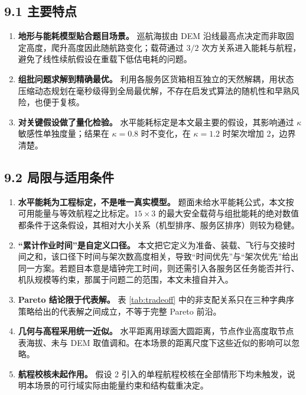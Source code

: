 \documentclass[withoutpreface,bwprint]{format}
\begin{document}
\subsection{9.1 主要特点}
\begin{enumerate}[leftmargin=*]
    \item \textbf{地形与能耗模型贴合题目场景。} 巡航海拔由 DEM 沿线最高点决定而非取固定高度，爬升高度因此随航路变化；载荷通过 $3/2$ 次方关系进入能耗与航程，避免了线性续航假设在重载下低估电耗的问题。
    \item \textbf{组批问题求解到精确最优。} 利用各服务区货箱相互独立的天然解耦，用状态压缩动态规划在毫秒级得到全局最优解，不存在启发式算法的随机性和早熟风险，也便于复核。
    \item \textbf{对关键假设做了量化检验。} 水平能耗标定是本文最主要的假设，其影响通过 $\kappa$ 敏感性单独度量；结果在 $\kappa=0.8$ 时不变化，在 $\kappa=1.2$ 时架次增加 2，边界清楚。
\end{enumerate}

\subsection{9.2 局限与适用条件}
\begin{enumerate}[leftmargin=*]
    \item \textbf{水平能耗为工程标定，不是唯一真实模型。} 题面未给水平能耗公式，本文按可用能量与等效航程之比标定。$15\times3$ 的最大安全载荷与组批能耗的绝对数值都条件于这条假设，其相对大小关系（机型排序、服务区排序）则较为稳健。
    \item \textbf{“累计作业时间”是自定义口径。} 本文把它定义为准备、装载、飞行与交接时间之和，该口径下时间与架次数高度相关，导致“时间优先”与“架次优先”给出同一方案。若题目本意是墙钟完工时间，则还需引入各服务区任务能否并行、机队规模等约束，那属于问题二的范围，本文未擅自并入。
    \item \textbf{Pareto 结论限于代表解。} 表 \ref{tab:tradeoff} 中的非支配关系只在三种字典序策略给出的代表解之间成立，不等于完整 Pareto 前沿。
    \item \textbf{几何与高程采用统一近似。} 水平距离用球面大圆距离，节点作业高度取节点表海拔、未与 DEM 取值调和。在本场景的距离尺度下这些近似的影响可以忽略。
    \item \textbf{航程校核未起作用。} 假设 2 引入的单程航程校核在全部情形下均未触发，说明本场景的可行域实际由能量约束和结构载重决定。
\end{enumerate}
\end{document}
